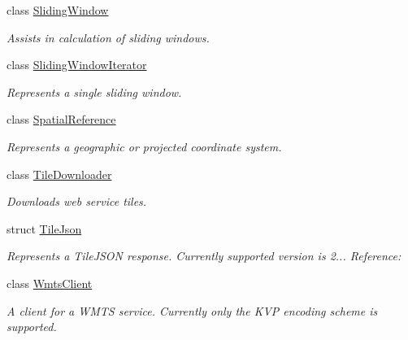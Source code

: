 \begin{DoxyCompactItemize}
class \hyperlink{classdg_1_1deepcore_1_1imagery_1_1_sliding_window}{Sliding\+Window}
\begin{DoxyCompactList}\small\item\em Assists in calculation of sliding windows. \end{DoxyCompactList}\item 
class \hyperlink{classdg_1_1deepcore_1_1imagery_1_1_sliding_window_iterator}{Sliding\+Window\+Iterator}
\begin{DoxyCompactList}\small\item\em Represents a single sliding window. \end{DoxyCompactList}\item 
class \hyperlink{classdg_1_1deepcore_1_1imagery_1_1_spatial_reference}{Spatial\+Reference}
\begin{DoxyCompactList}\small\item\em Represents a geographic or projected coordinate system. \end{DoxyCompactList}\item 
class \hyperlink{structdg_1_1deepcore_1_1imagery_1_1_tile_downloader}{Tile\+Downloader}
\begin{DoxyCompactList}\small\item\em Downloads web service tiles. \end{DoxyCompactList}\item 
struct \hyperlink{structdg_1_1deepcore_1_1imagery_1_1_tile_json}{Tile\+Json}
\begin{DoxyCompactList}\small\item\em Represents a Tile\+J\+S\+ON response. Currently supported version is 2... Reference\+: \href{https://github.com/mapbox/tilejson-spec/tree/master/2.0.0}{\tt } \end{DoxyCompactList}\item 
class \hyperlink{classdg_1_1deepcore_1_1imagery_1_1_wmts_client}{Wmts\+Client}
\begin{DoxyCompactList}\small\item\em A client for a W\+M\+TS service. Currently only the K\+VP encoding scheme is supported. \end{DoxyCompactList}\end{DoxyCompactItemize}
